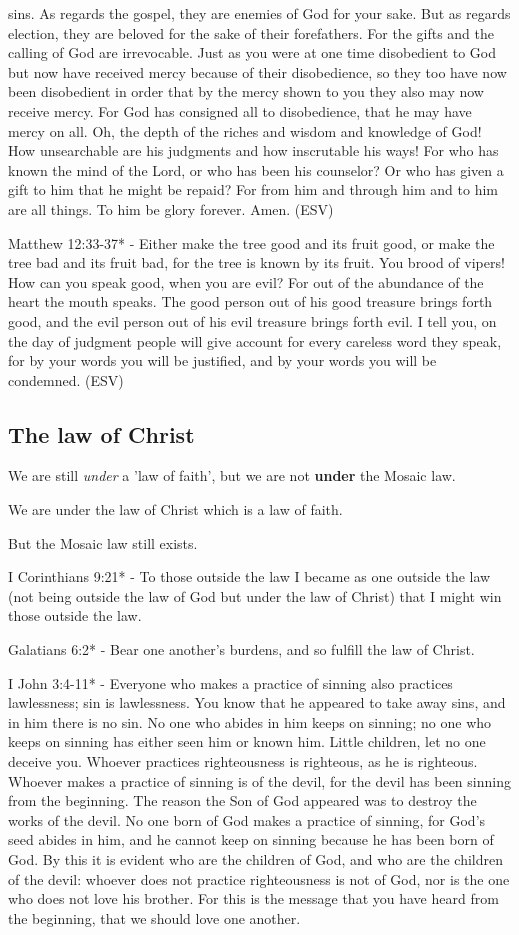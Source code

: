 \documentclass[11pt]{article}
\begin{document}
sins. As regards the gospel, they are enemies of God for your sake. But as regards election, they are beloved for the sake of their forefathers. For the gifts and the calling of God are irrevocable. Just as you were at one time disobedient to God but now have received mercy because of their disobedience, so they too have now been disobedient in order that by the mercy shown to you they also may now receive mercy. For God has consigned all to disobedience, that he may have mercy on all. Oh, the depth of the riches and wisdom and knowledge of God! How unsearchable are his judgments and how inscrutable his ways! For who has known the mind of the Lord, or who has been his counselor? Or who has given a gift to him that he might be repaid? For from him and through him and to him are all things. To him be glory forever. Amen. (ESV)

Matthew 12:33-37* -  Either make the tree good and its fruit good, or make the tree bad and its fruit bad, for the tree is known by its fruit.  You brood of vipers! How can you speak good, when you are evil?  For out of the abundance of the heart the mouth speaks.  The good person out of his good treasure brings forth good, and the evil person out of his evil treasure brings forth evil.  I tell you, on the day of judgment people will give account for every careless word they speak, for by your words you will be justified, and by your words you will be condemned.  (ESV)

\subsection{The law of Christ}
\label{sec:org49ecbbf}
We are still \emph{under} a 'law of faith', but we are not \textbf{under} the Mosaic law.

We are under the law of Christ which is a law of faith.

But the Mosaic law still exists.

I Corinthians 9:21* - To those outside the law I became as one outside the law (not being outside the law of God but under the law of Christ) that I might win those outside the law.

Galatians 6:2* - Bear one another's burdens, and so fulfill the law of Christ.

I John 3:4-11* - Everyone who makes a practice of sinning also practices lawlessness; sin is lawlessness.  You know that he appeared to take away sins, and in him there is no sin.  No one who abides in him keeps on sinning; no one who keeps on sinning has either seen him or known him.  Little children, let no one deceive you. Whoever practices righteousness is righteous, as he is righteous.  Whoever makes a practice of sinning is of the devil, for the devil has been sinning from the beginning. The reason the Son of God appeared was to destroy the works of the devil.  No one born of God makes a practice of sinning, for God's seed abides in him, and he cannot keep on sinning because he has been born of God.  By this it is evident who are the children of God, and who are the children of the devil: whoever does not practice righteousness is not of God, nor is the one who does not love his brother.  For this is the message that you have heard from the beginning, that we should love one another.
\end{document}
